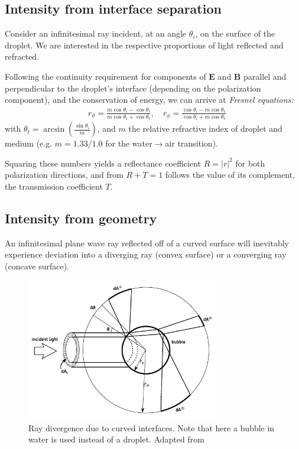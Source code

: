 \documentclass[11.5pt,oneside]{book}
\begin{document}
\subsection{Intensity from interface separation}
Consider an infinitesimal ray incident, at an angle $\theta_i$, on the surface
of the droplet. We are interested in the respective proportions of light
reflected and refracted.

Following the continuity requirement for components of $\mathbf{E}$ and
$\mathbf{B}$ parallel and perpendicular to the droplet's interface (depending on
the polarization component), and the conservation of energy, we can arrive at
\emph{Fresnel equations:}
\begin{align}
    \label{eq:fresnelequations}
    &r_\vartheta = \frac{m \cos \theta_i - \cos \theta_t}{m \cos \theta_i +
\cos \theta_t},\quad
r_\phi = \frac{\cos \theta_i - m \cos \theta_t}{\cos \theta_i +
m \cos \theta_t}
\end{align}
with $\theta_t = \arcsin\left(\frac{\sin \theta_i}{m}\right)$, and $m$ the
relative refractive index of droplet and medium (e.g. $m = 1.33/1.0$ for the
water$\rightarrow$air transition).

Squaring these numbers yields a reflectance coefficient $R = |r|^2$ for both
polarization directions, and from $R + T = 1$ follows the value of its 
complement, the transmission coefficient $T$.

\subsection{Intensity from geometry}
An infinitesimal plane wave ray reflected off of a curved surface will inevitably
experience deviation into a diverging ray (convex surface) or a converging ray
(concave surface).

\begin{figure}
\centering
\includegraphics[width=0.75\textwidth]{img/scattering/scatterintensity.pdf}
\caption{Ray divergence due to curved interfaces. Note that here a bubble in
water is used instead of a droplet. Adapted from \citet{Albrecht03}}
\label{fig:scatterintensity}
\end{figure}
\end{document}
